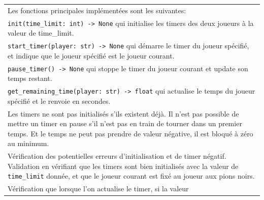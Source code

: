 \documentclass[a4paper,12pt]{article}
\begin{document}
\begin{tabularx}{\textwidth}{|X|}
    Les fonctions principales implémentées sont les suivantes:                                                                                                                                                                                     \\
    \texttt{init(time\_limit: int) -> None} qui initialise les timers des deux
    joueurs à la valeur de time\_limit.                                                                                                                                                                                                            \\ \texttt{start\_timer(player: str) ->
        None} qui démarre le timer du joueur spécifié, et indique que le joueur
    spécifié est le joueur courant.                                                                                                                                                                                                                \\ \texttt{pause\_timer() -> None} qui stoppe
    le timer du joueur courant et update son temps restant.                                                                                                                                                                                        \\
    \texttt{get\_remaining\_time(player: str) -> float} qui actualise le temps du
    joueur spécifié et le renvoie en secondes.                                                                                                                                                                                                     \\ Les timers ne sont pas
    initialisés s’ils existent déjà. Il n’est pas possible de mettre un timer en
    pause s’il n’est pas en train de tourner dans un premier temps. Et le temps ne
    peut pas prendre de valeur négative, il est bloqué à zéro au minimum.                                                                                                                                                                          \\
    \arrayrulecolor{MediumAquamarine}\hline \arrayrulecolor{CornflowerBlue}
    Vérification des potentielles erreurs d’initialisation et de timer négatif.
    Validation en vérifiant que les timers sont bien initialisés avec la valeur de
    \texttt{time\_limit} donnée, et que le joueur courant est fixé au joueur aux
    pions noirs.                                                                                                                                                                                                                                   \\ Vérification que lorsque l’on actualise le timer, si la valeur

\end{tabularx}
\end{document}
